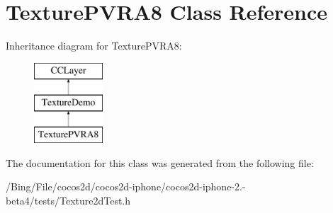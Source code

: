 \hypertarget{interface_texture_p_v_r_a8}{\section{Texture\-P\-V\-R\-A8 Class Reference}
\label{interface_texture_p_v_r_a8}
}
Inheritance diagram for Texture\-P\-V\-R\-A8\-:\begin{figure}[H]
\begin{center}
\leavevmode
\includegraphics[height=3.000000cm]{interface_texture_p_v_r_a8}
\end{center}
\end{figure}


The documentation for this class was generated from the following file\-:\begin{DoxyCompactItemize}
\item 
/\-Bing/\-File/cocos2d/cocos2d-\/iphone/cocos2d-\/iphone-\/2.-\/beta4/tests/Texture2d\-Test.\-h\end{DoxyCompactItemize}
